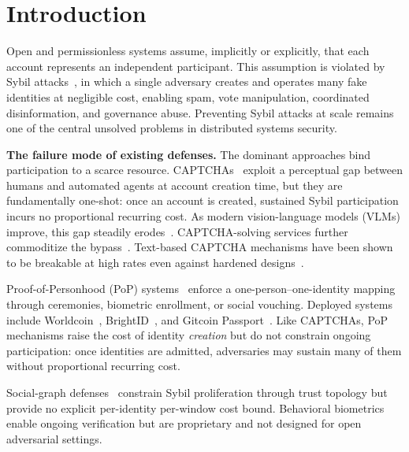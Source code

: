 \documentclass[11pt]{article}
\theoremstyle{remark}
\theoremstyle{plain}
\begin{document}
	
	\section{Introduction}
	\label{sec:intro}
	
	Open and permissionless systems assume, implicitly or explicitly, that
	each account represents an independent participant. This assumption is
	violated by Sybil attacks~\cite{douceur2002sybil}, in which a single
	adversary creates and operates many fake identities at negligible cost,
	enabling spam, vote manipulation, coordinated disinformation, and
	governance abuse. Preventing Sybil attacks at scale remains one of
	the central unsolved problems in distributed systems security.
	
	\noindent\textbf{The failure mode of existing defenses.}
	The dominant approaches bind participation to a scarce resource.
	CAPTCHAs~\cite{vonahn2003captcha} exploit a perceptual gap between
	humans and automated agents at account creation time, but they are
	fundamentally one-shot: once an account is created, sustained Sybil
	participation incurs no proportional recurring cost. As modern
	vision-language models (VLMs) improve, this gap steadily
	erodes~\cite{sivakorn2016iam,ye2018yet,goodfellow2014multidigit}.
	CAPTCHA-solving services further commoditize the
	bypass~\cite{motoyama2010recaptchas}. Text-based CAPTCHA mechanisms
	have been shown to be breakable at high rates even against hardened
	designs~\cite{bursztein2011text}.
	
	Proof-of-Personhood (PoP) systems~\cite{borge2017proofofpersonhood,ford2020pseudonym}
	enforce a one-person--one-identity mapping through ceremonies, biometric
	enrollment, or social vouching. Deployed systems include
	Worldcoin~\cite{worldcoin2023}, BrightID~\cite{brightid2022}, and
	Gitcoin Passport~\cite{gitcoin2023}. Like CAPTCHAs, PoP mechanisms
	raise the cost of identity \emph{creation} but do not constrain ongoing
	participation: once identities are admitted, adversaries may sustain
	many of them without proportional recurring cost.
	
	Social-graph defenses~\cite{yu2006sybilguard,yu2008sybillimit,danezis2009sybilinfer,wang2013clickstream}
	constrain Sybil proliferation through trust topology but provide no
	explicit per-identity per-window cost bound. Behavioral
	biometrics~\cite{frank2013touchalytics,serwadda2013kids} enable ongoing
	verification but are proprietary and not designed for open adversarial
	settings.
	
\end{document}
